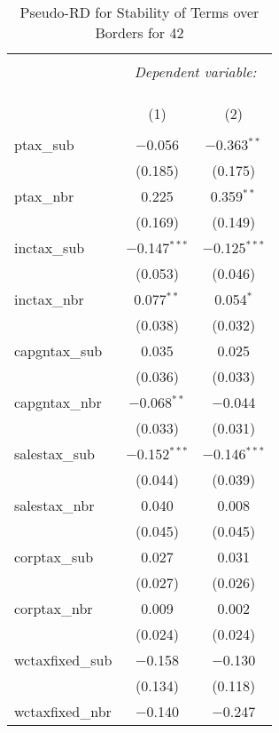 
\begin{table}[!htbp] \centering 
  \caption{Pseudo-RD for Stability of Terms over Borders for  42} 
  \label{} 
\begin{tabular}{@{\extracolsep{5pt}}lcc} 
\\[-1.8ex]\hline 
\hline \\[-1.8ex] 
 & \multicolumn{2}{c}{\textit{Dependent variable:}} \\ 
\cline{2-3} 
\\[-1.8ex] & \multicolumn{2}{c}{ } \\ 
\\[-1.8ex] & (1) & (2)\\ 
\hline \\[-1.8ex] 
 ptax\_sub & $-$0.056 & $-$0.363$^{**}$ \\ 
  & (0.185) & (0.175) \\ 
  ptax\_nbr & 0.225 & 0.359$^{**}$ \\ 
  & (0.169) & (0.149) \\ 
  inctax\_sub & $-$0.147$^{***}$ & $-$0.125$^{***}$ \\ 
  & (0.053) & (0.046) \\ 
  inctax\_nbr & 0.077$^{**}$ & 0.054$^{*}$ \\ 
  & (0.038) & (0.032) \\ 
  capgntax\_sub & 0.035 & 0.025 \\ 
  & (0.036) & (0.033) \\ 
  capgntax\_nbr & $-$0.068$^{**}$ & $-$0.044 \\ 
  & (0.033) & (0.031) \\ 
  salestax\_sub & $-$0.152$^{***}$ & $-$0.146$^{***}$ \\ 
  & (0.044) & (0.039) \\ 
  salestax\_nbr & 0.040 & 0.008 \\ 
  & (0.045) & (0.045) \\ 
  corptax\_sub & 0.027 & 0.031 \\ 
  & (0.027) & (0.026) \\ 
  corptax\_nbr & 0.009 & 0.002 \\ 
  & (0.024) & (0.024) \\ 
  wctaxfixed\_sub & $-$0.158 & $-$0.130 \\ 
  & (0.134) & (0.118) \\ 
  wctaxfixed\_nbr & $-$0.140 & $-$0.247 \\ 

\end{tabular}
\end{table}
